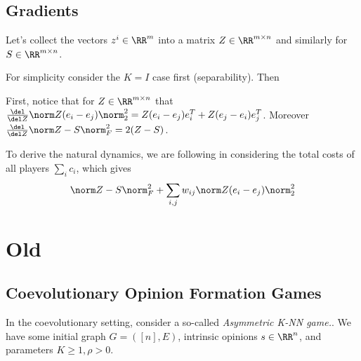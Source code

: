 \subsection{Gradients}

Let's collect the vectors $z^i \in \RR^m$ into a matrix $Z \in \RR^{m \times n}$ and similarly for $S \in \RR^{m \times n}$. 

For simplicity consider the $K = I$ case first (separability). Then 


First, notice that for $Z \in \RR^{m \times n}$ that $\frac{\del}{\del Z} \norm Z(e_i - e_j) \norm_2^2 = Z(e_i - e_j)e_i^T + Z(e_j - e_i)e_j^T$. Moreover $\frac{\del}{\del Z} \norm Z - S \norm_F^2 = 2(Z - S)$. 

To derive the natural dynamics, we are following \cite{bindel2011} in considering the total costs of all players $\sum_i c_i$, which gives 
\[
\norm Z - S \norm_F^2 + \sum_{i, j} w_{ij} \norm Z(e_i - e_j) \norm_2^2
\]






\section{Old}


\subsection{Coevolutionary Opinion Formation Games}
In the coevolutionary setting, consider a so-called {\em Asymmetric K-NN game.}. We have some initial graph $G = ([n], E)$, intrinsic opinions $s \in \RR^n$, and parameters $K \geq 1, \rho > 0$. 


